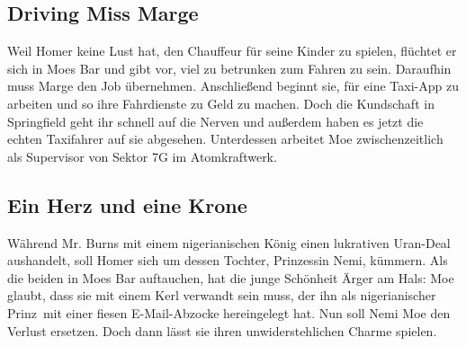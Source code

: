 
\subsection{Driving Miss Marge}
Weil Homer keine Lust hat, den Chauffeur für seine Kinder zu spielen, flüchtet er sich in Moes Bar und gibt vor, viel zu betrunken zum Fahren zu sein. Daraufhin muss Marge den Job übernehmen. Anschließend beginnt sie, für eine Taxi-App zu arbeiten und so ihre Fahrdienste zu Geld zu machen. Doch die Kundschaft in Springfield geht ihr schnell auf die Nerven und außerdem haben es jetzt die echten Taxifahrer auf sie abgesehen. Unterdessen arbeitet Moe zwischenzeitlich als Supervisor von Sektor 7G im Atomkraftwerk.


\subsection{Ein Herz und eine Krone}\label{TABF08}
Während Mr. Burns mit einem nigerianischen König einen lukrativen Uran-Deal aushandelt, soll Homer sich um dessen Tochter, Prinzessin Nemi, kümmern. Als die beiden in Moes Bar auftauchen, hat die junge Schönheit Ärger am Hals: Moe glaubt, dass sie mit einem Kerl verwandt sein muss, der ihn als \glqq nigerianischer Prinz\grqq\ mit einer fiesen E-Mail-Abzocke hereingelegt hat. Nun soll Nemi Moe den Verlust ersetzen. Doch dann lässt sie ihren unwiderstehlichen Charme spielen.

